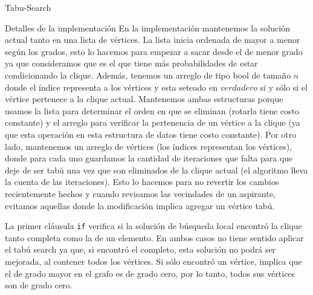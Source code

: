\begin{section}{Tabu-Search}
\begin{subsection}{Detalles de la implementación}
		En la implementación mantenemos la solución actual tanto en una lista de vértices. La lista inicia ordenada de mayor a menor según los grados, esto lo hacemos para empezar a sacar desde el de menor grado ya que consideramos que es el que tiene más probabilidades de estar condicionando la clique. Además, tenemos un arreglo de tipo bool de tamaño $n$ donde el índice representa a los vértices y esta seteado en $verdadero$ si y sólo si el vértice pertenece a la clique actual. Mantenemos ambas estructuras porque usamos la lista para determinar el orden en que se eliminan (rotarla tiene costo constante) y el arreglo para verificar la pertenencia de un vértice a la clique (ya que esta operación en esta estructura de datos tiene costo constante).
		Por otro lado, mantenemos un arreglo de vértices (los índices representan los vértices), donde para cada uno guardamos la cantidad de iteraciones que falta para que deje de ser tabú una vez que son eliminados de la clique actual (el algoritmo lleva la cuenta de las iteraciones). Esto lo hacemos para no revertir los cambios recientemente hechos y cuando revisamos las vecindades de un aspirante, evitamos aquellas donde la modificación implica agregar un vértice tabú.

		La primer cláusula \texttt{if} verifica si la solución de búsqueda local encontró la clique tanto completa como la de un elemento. En ambos casos no tiene sentido aplicar el tabú search ya que, si encontró el completo, esta solución no podrá ser mejorada, al contener todos los vértices. Si sólo encontró un vértice, implica que el de grado mayor en el grafo es de grado cero, por lo tanto, todos sus vértices son de grado cero.


\end{subsection}
\end{section}
